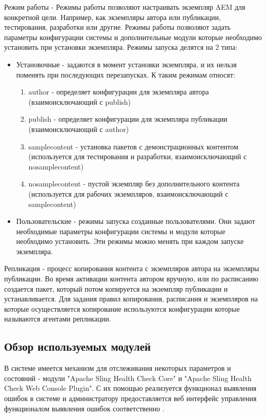 Режим работы - Режимы работы позволяют настраивать экземпляр AEM для конкретной цели. Например, как экземпляры автора или публикации, тестирования, разработки или другие. Режимы работы позволяют задать параметры конфигурации системы и дополнительные модули которые необходимо установить при установки экземпляра. Режимы запуска делятся на 2 типа:
\begin{itemize}
\item Установочные - задаются в момент установки экземпляра, и их нельзя поменять при последующих перезапусках. К таким режимам относят:
\begin{enumerate}
\item author - определяет конфигурации для экземпляра автора (взаимоисключающий с publish)
\item publish - определяет конфигурации для экземпляра публикации (взаимоисключающий с author) 
\item samplecontent - установка пакетов с демонстрационных контентом (используется для тестирования и разработки, взаимоисключающий с nosamplecontent)
\item nosamplecontent - пустой экземпляр без дополнительного контента (используется для рабочих экземпляров, взаимоисключающий с samplecontent)
\end{enumerate}
\item Пользовательские - режимы запуска созданные пользователями. Они задают необходимые параметры конфигурации системы и модули которые необходимо установить. Эти режимы можно менять при каждом запуске экземпляра.
\end{itemize}

Репликация - процесс копирования контента с экземпляров автора на экземпляры публикации. Во время активации контента автором вручную, или по расписанию создается пакет, который потом копируется на экземпляр публикации и устанавливается. Для задания правил копирования, расписания и экземпляров на которые осуществляется копирование используются конфигурации которые называются агентами репликации.

\subsection{Обзор используемых модулей}
	В системе имеется механизм для отслеживания некоторых параметров и состояний - модули "Apache Sling Health Check Core" и "Apache Sling Health Check Web Console Plugin". С их помощью реализуется функционал выявления ошибок в системе и администратору предоставляется веб интерфейс управления функционалом выявления ошибок соответственно \cite{web:slingHealthCheck}.

